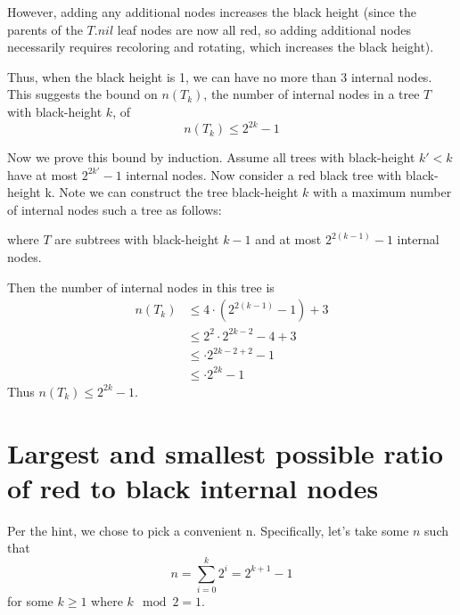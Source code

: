 \documentclass[paper=a4, fontsize=11pt]{scrartcl} %
\numberwithin{equation}{section} %
\numberwithin{figure}{section} %
\numberwithin{table}{section} %
\begin{document}
However, adding any additional nodes increases the black height (since the parents of the $T.nil$ leaf nodes are now all red, so adding additional nodes necessarily requires recoloring and rotating, which increases the black height).

Thus, when the black height is 1, we can have no more than 3 internal nodes. This suggests the bound on $n(T_k)$, the number of internal nodes in a tree $T$ with black-height $k$, of
\[n(T_k) \leq 2^{2k} - 1\]

Now we prove this bound by induction. Assume all trees with black-height $k' < k$ have at most $2^{2k'} - 1$ internal nodes. Now consider a red black tree with black-height k. Note we can construct the tree black-height $k$ with a maximum number of internal nodes such a tree as follows:
\begin{center}
\end{center}
where $T$ are subtrees with black-height $k - 1$ and at most $2^{2(k-1)} - 1$ internal nodes.

Then the number of internal nodes in this tree is
\begin{align*}
n(T_k) &\leq 4\cdot (2^{2(k-1)} - 1) + 3 \\
	&\leq 2^2\cdot 2^{2k - 2} - 4 + 3 \\
	&\leq \cdot 2^{2k - 2 + 2} - 1 \\
	&\leq \cdot 2^{2k} - 1
\end{align*}
Thus $n(T_k) \leq 2^{2k} - 1$.

\section{Largest and smallest possible ratio of red to black internal nodes}

Per the hint, we chose to pick a convenient n. Specifically, let's take some $n$ such that
\[n = \sum_{i=0}^k 2^i = 2^{k+1} - 1\]
for some $k \geq 1$ where $k \mod 2 = 1$.
\end{document}
